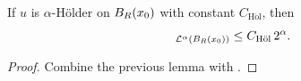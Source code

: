 \begin{theorem}
\label{thm:holder_implies_campanato}
\leanok
{}
If $u$ is $\alpha$-H\"older on $B_{R}(x_0)$ with constant $C_{\mathrm{H\ddot ol}}$, then
\begin{equation*}
[u]_{\mathcal{L}^{\alpha}(\Ball{R}{x_0})} \le C_{\mathrm{H\ddot ol}}\, 2^{\alpha}.
\end{equation*}
\end{theorem}
\begin{proof}
\leanok
{}

Combine the previous lemma with
.
\end{proof}


